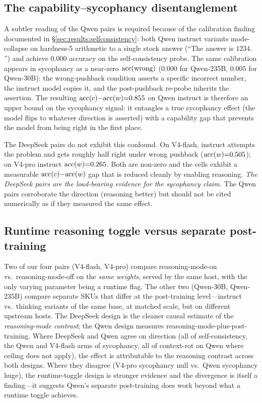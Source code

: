 \subsection{The capability--sycophancy disentanglement}
\label{sec:discussion:capability}

A subtler reading of the Qwen pairs is required because of the
calibration finding documented in
\S\ref{sec:results:selfconsistency}: both Qwen instruct variants
mode-collapse on hardness-5 arithmetic to a single stock answer
(``The answer is $1234.$'') and achieve $0.000$ accuracy on the
self-consistency probe. The same calibration appears in sycophancy as
a near-zero $\mathrm{acc}(\mathrm{wrong})$ ($0.000$ for Qwen-235B, $0.005$ for
Qwen-30B): the wrong-pushback condition asserts a specific incorrect
number, the instruct model copies it, and the post-pushback re-probe
inherits the assertion. The resulting
$\mathrm{acc}(c){-}\mathrm{acc}(w){=}0.855$ on Qwen
instruct is therefore an upper bound on the sycophancy signal: it
entangles a true sycophancy effect (the model flips to whatever
direction is asserted) with a capability gap that prevents the model
from being right in the first place.

The DeepSeek pairs do not exhibit this confound. On V4-flash, instruct
attempts the problem and gets roughly half right under wrong pushback
($\mathrm{acc}(w){=}0.505$); on V4-pro instruct $\mathrm{acc}(w){=}0.265$. Both are
non-zero and the cells exhibit a measurable
$\mathrm{acc}(c){-}\mathrm{acc}(w)$ gap that is reduced cleanly by enabling reasoning.
\emph{The DeepSeek pairs are the load-bearing evidence for the
sycophancy claim.} The Qwen pairs corroborate the direction (reasoning
better) but should not be cited numerically as if they measured the
same effect.

\subsection{Runtime reasoning toggle versus separate post-training}
\label{sec:discussion:within-vs-cross}

Two of our four pairs (V4-flash, V4-pro) compare reasoning-mode-on
vs.\ reasoning-mode-off on the \emph{same weights}, served by the same
host, with the only varying parameter being a runtime flag. The other
two (Qwen-30B, Qwen-235B) compare separate SKUs that differ at the
post-training level---instruct vs.\ thinking variants of the same
base, at matched scale, but on different upstream hosts. The DeepSeek
design is the cleaner causal estimate of the
\emph{reasoning-mode contrast}; the Qwen design measures
reasoning-mode-plus-post-training. Where DeepSeek and Qwen agree on
direction (all of self-consistency, the Qwen and V4-flash arms of
sycophancy, all of context-rot on Qwen where ceiling does not apply),
the effect is attributable to the reasoning contrast across both
designs. Where they disagree (V4-pro sycophancy null vs.\ Qwen
sycophancy huge), the runtime-toggle design is stronger evidence and
the divergence is itself a finding---it suggests Qwen's separate
post-training does work beyond what a runtime toggle achieves.

